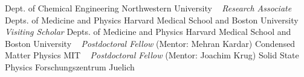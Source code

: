    Dept. of Chemical Engineering
\newline
Northwestern University
\newline
~
\Gap
{}
\textit{Research Associate} 
    \newline
    Depts. of Medicine and Physics
\newline
Harvard Medical School and Boston University
\newline
~
\Gap
{}
\textit{Visiting Scholar} 
    \newline
    Depts. of Medicine and Physics
\newline
Harvard Medical School and Boston University
\newline
~
\Gap
{}
\textit{Postdoctoral Fellow} (Mentor: Mehran Kardar)
    \newline
    Condensed Matter Physics
\newline
MIT
\newline
~
\Gap
{}
\textit{Postdoctoral Fellow} (Mentor: Joachim Krug)
    \newline
    Solid State Physics
\newline
Forschungszentrum Juelich
\newline
~
\Gap
\vspace*{0.2cm}